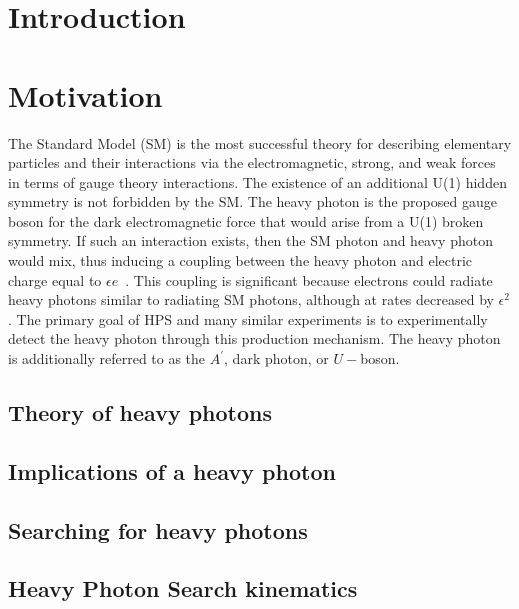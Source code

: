 \documentclass[12pt]{report}
\begin{document}
\afterpreface


\chapter{Introduction}


\chapter{Motivation} 
The Standard Model (SM) is the most successful theory for describing elementary particles and their interactions via the electromagnetic, strong, and weak forces in terms of gauge theory interactions. The existence of an additional U(1) hidden symmetry is not forbidden by the SM. The heavy photon is the proposed gauge boson for the dark electromagnetic force that would arise from a U(1) broken symmetry. If such an interaction exists, then the SM photon and heavy photon would mix, thus inducing a coupling between the heavy photon and electric charge equal to $\epsilon e$~\cite{holdom_two_1986}. This coupling is significant because electrons could radiate heavy photons similar to radiating SM photons, although at rates decreased by $\epsilon^2$. The primary goal of HPS and many similar experiments is to experimentally detect the heavy photon through this production mechanism. The heavy photon is additionally referred to as the $A^{\prime}$, dark photon, or $U-$boson.

\section{Theory of heavy photons}


\section{Implications of a heavy photon}


\section{Searching for heavy photons}


\section{Heavy Photon Search kinematics}

\end{document}
